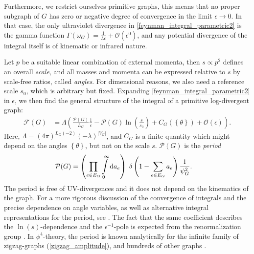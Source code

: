 \documentclass[11pt,a4paper]{article}
\newcommand{\abs}[1]{\lvert #1 \rvert}
\renewcommand{\d}{\textnormal{d}}
\newcommand{\period}{\mathcal P}
\renewcommand{\|}{\rule[-0.4ex]{0.2ex}{1.2em}}
\begin{document}
	
	Furthermore, we restrict ourselves primitive graphs, this means that no proper subgraph of $G$ has zero or negative degree of convergence in the limit $\epsilon \rightarrow 0$. In that case, the only ultraviolet divergence in \cref{feynman_integral_parametric2} is the gamma function $\Gamma(\omega_G)=\frac{1}{L \epsilon}+ \mathcal O \left( \epsilon^0 \right) $, and any potential divergence of the integral itself is    of kinematic or infrared nature.
	
	Let $p$ be a suitable linear combination of external momenta, then $s \propto p^2$ defines an overall \emph{scale}, and all masses and momenta can be expressed relative to $s$ by  scale-free ratios, called \emph{angles}. For dimensional reasons, we also need  a reference scale $s_0$, which is arbitrary but fixed.
	Expanding \cref{feynman_integral_parametric2} in $\epsilon$, we then find the general structure of the integral of a primitive log-divergent graph:
	\begin{align}\label{amplitude_period} 
		\mathcal F (G) &=\Lambda \left(  \frac{  \period (G)}{  L_G  } \frac{1}{\epsilon}- \period(G) \ln \left( \frac s {s_0}  \right)   +C_G\left( \left \lbrace \theta \right \rbrace   \right)   + \mathcal  O \left( \epsilon \right) \right).
	\end{align}
	Here,  $\Lambda = 	  (4\pi)^{ L_G  (- 2 )}    (- \lambda )^{\abs{V_G}} $,   and $C_G$ is a finite quantity which might depend on the angles $\left \lbrace \theta \right \rbrace  $, but not on the scale $s$. $\period(G)$ is the \emph{period}
	\begin{align}\label{def:period}
		\period (G)&=  \left( \prod_{e\in E_G} \int \limits_0^\infty \d a_e  \right)   \; \delta \left( 1-\sum_{e\in E_G}  a_e \right) \frac{1} {\psi_G^{ 2}}.
	\end{align}
	The period is free of UV-divergences and it does not depend on the kinematics of the graph.
	For a more rigorous discussion of the convergence of   integrals and the precise dependence on angle variables, as well as alternative integral representations for the period, see \cite{bloch_motives_2006,schnetz_quantum_2010,brown_angles_2013}. The fact that the same coefficient describes the $\ln(s)$-dependence and the $\epsilon^{-1}$-pole is expected from the renormalization group \cite{wilson_renormalization_1974}. In $\phi^4$-theory, the period is known analytically for the infinite family of zigzag-graphs (\cref{zigzag_amplitude}), and hundreds of other graphs  \cite{broadhurst_knots_1995,schnetz_quantum_2010,brown_singlevalued_2015,panzer_analytic_2013,panzer_galois_2017,schnetz_numbers_2018,schnetz_hyperlogprocedures_2023}.
	
\end{document}
